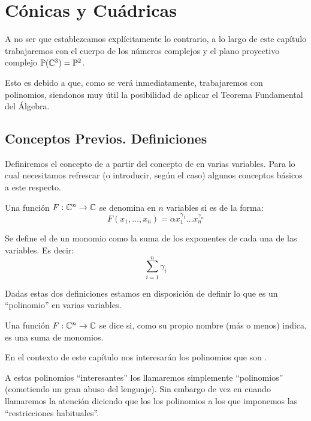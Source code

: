 \chapter{Cónicas y Cuádricas}
\label{C8}
A no ser que establezcamos explícitamente lo contrario, a lo largo de este capítulo trabajaremos con el cuerpo de los números complejos y el plano proyectivo complejo $\mathbb{P}(\mathbb{C}^3)=\mathbb{P}^2$. 

Esto es debido a que, como se verá inmediatamente, trabajaremos con polinomios, siendonos muy útil la posibilidad de aplicar el Teorema Fundamental del Álgebra.

\section{Conceptos Previos. Definiciones}
Definiremos el concepto de  a partir del concepto de  en varias variables. Para lo cual necesitamos refrescar (o introducir, según el caso) algunos conceptos básicos a este respecto.
\begin{defi}[Monomio]
	Una función $F:\mathbb{C}^n\to\mathbb{C}$ se denomina  en $n$ variables si es de la forma:
	\[F(x_1,\dots,x_n)=\alpha x_1^{\gamma_1}\dots x_n^{\gamma_n}\]
\end{defi}
\begin{defi}
	Se define el  de un monomio como la suma de los exponentes de cada una de las variables. Es decir:
	\[\sum_{i=1}^{n}\gamma_i\]
\end{defi}
Dadas estas dos definiciones estamos en disposición de definir lo que es un ``polinomio'' en varias variables.
\begin{defi}[Polinomio]
Una función $F:\mathbb{C}^n\to \mathbb{C}$ se dice  si, como su propio nombre (más o menos) indica, es una suma de monomios.
\end{defi}
En el contexto de este capítulo nos interesarán los polinomios que son .

A estos polinomios ``interesantes'' los llamaremos simplemente ``polinomios'' (cometiendo un gran abuso del lenguaje). Sin embargo de vez en cuando llamaremos la atención diciendo que los los polinomios a los que imponemos las ``restricciones habituales''.

